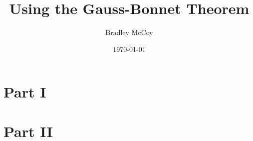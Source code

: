 \documentclass[10pt]{article}
\title{Using the Gauss-Bonnet Theorem}
\author{Bradley McCoy}
\date{\today}
\begin{document}
\maketitle \tableofcontents 


\section{Part I}


%
\section{Part II}





{
\small

%

}
\end{document}
